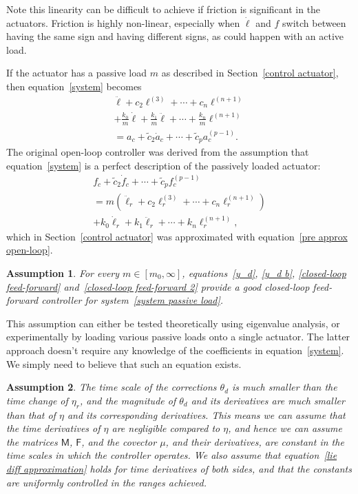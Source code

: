 \documentclass[oneside,twocolumn,reqno]{amsart}
\newtheorem{assumption}{Assumption}
\begin{document}
Note this linearity can be difficult to achieve if friction is significant in the actuators.  Friction is highly non-linear, especially when $\dot \ell$ and $f$ switch between having the same sign and having different signs, as could happen with an active load.

If the actuator has a passive load $m$ as described in Section~\ref{control actuator}, then equation~\eqref{system} becomes
\begin{multline}
\label{system passive load}
\ddot \ell + c_2 \ell^{(3)} + \cdots + c_n \ell^{(n+1)} \\
+ \tfrac{k_0}m \dot \ell + \tfrac{k_1}m \ddot \ell + \cdots + \tfrac{k_n}m \ell^{(n+1)} \\
= a_c + \tilde c_2 \dot a_c + \cdots + \tilde c_p a_c^{(p-1)}.
\end{multline}
The original open-loop controller was derived from the assumption that equation~\eqref{system} is a perfect description of the passively loaded actuator:
\begin{multline}
f_c + \tilde c_2 \dot f_c + \cdots + \tilde c_p f_c^{(p-1)} \\
= m(\ddot \ell_r + c_2 \ell_r^{(3)} + \cdots + c_n \ell_r^{(n+1)}) \\
+ k_0 \dot \ell_r + k_1 \ddot \ell_r + \cdots + k_n \ell_r^{(n+1)} ,
\end{multline}
which in Section~\ref{control actuator} was approximated with equation~\eqref{pre approx open-loop}.

\begin{assumption}
\label{assume closed-loop feed-forward}
For every $m \in [m_0, \infty]$, equations~\eqref{y_d}, \eqref{y_d b}, \eqref{closed-loop feed-forward} and~\eqref{closed-loop feed-forward 2} provide a good closed-loop feed-forward controller for system~\eqref{system passive load}.
\end{assumption}

This assumption can either be tested theoretically using eigenvalue analysis, or experimentally by loading various passive loads onto a single actuator.  The latter approach doesn't require any knowledge of the coefficients in equation~\eqref{system}.  We simply need to believe that such an equation exists.

\begin{assumption} \label{time scale} The time scale of the corrections $\theta_d$ is much smaller than the time change of $\eta_r$, and the magnitude of $\theta_d$ and its derivatives are much smaller than that of $\eta$ and its corresponding derivatives.  This means we can assume that the time derivatives of $\eta$ are negligible compared to $\eta$, and hence we can assume the matrices $\mathsf M$, $\mathsf F$, and the covector $\mu$, and their derivatives, are constant in the time scales in which the controller operates.  We also assume that equation~\eqref{lie diff approximation} holds for time derivatives of both sides, and that the constants are uniformly controlled in the ranges achieved.
\end{assumption}
\end{document}
